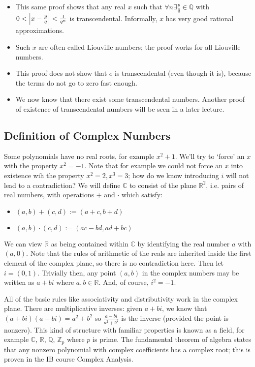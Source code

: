 \documentclass{article}
\begin{document}
	\begin{itemize}
		\item This same proof shows that any real $x$ such that $\forall n \exists \frac{p}{q}\in \mathbb Q$ with $0 < \abs{x - \frac{p}{q}} < \frac{1}{q^n}$ is transcendental. Informally, $x$ has very good rational approximations.
		\item Such $x$ are often called Liouville numbers; the proof works for all Liouville numbers.
		\item This proof does not show that $e$ is transcendental (even though it is), because the terms do not go to zero fast enough.
		\item We now know that there exist some transcendental numbers. Another proof of existence of transcendental numbers will be seen in a later lecture.
	\end{itemize}

	\subsection{Definition of Complex Numbers}
	Some polynomials have no real roots, for example $x^2 + 1$. We'll try to `force' an $x$ with the property $x^2 = -1$. Note that for example we could not force an $x$ into existence wih the property $x^2=2, x^3=3$; how do we know introducing $i$ will not lead to a contradiction? We will define $\mathbb C$ to consist of the plane $\mathbb R^2$, i.e. pairs of real numbers, with operations $+$ and $\cdot$ which satisfy:
	\begin{itemize}
		\item $(a,b)+(c,d) := (a+c, b+d)$
		\item $(a,b)\cdot(c,d) := (ac-bd, ad+bc)$
	\end{itemize}
	We can view $\mathbb R$ as being contained within $\mathbb C$ by identifying the real number $a$ with $(a, 0)$. Note that the rules of arithmetic of the reals are inherited inside the first element of the complex plane, so there is no contradiction here. Then let $i=(0,1)$. Trivially then, any point $(a, b)$ in the complex numbers may be written as $a+bi$ where $a, b \in \mathbb R$. And, of course, $i^2 = -1$.
	
	All of the basic rules like associativity and distributivity work in the complex plane. There are multiplicative inverses: given $a+bi$, we know that $(a+bi)(a-bi) = a^2 + b^2$ so $\frac{a-bi}{a^2 + b^2}$ is the inverse (provided the point is nonzero). This kind of structure with familiar properties is known as a field, for example $\mathbb C$, $\mathbb R$, $\mathbb Q$, $\mathbb Z_p$ where $p$ is prime. The fundamental theorem of algebra states that any nonzero polynomial with complex coefficients has a complex root; this is proven in the IB course Complex Analysis.
\end{document}
